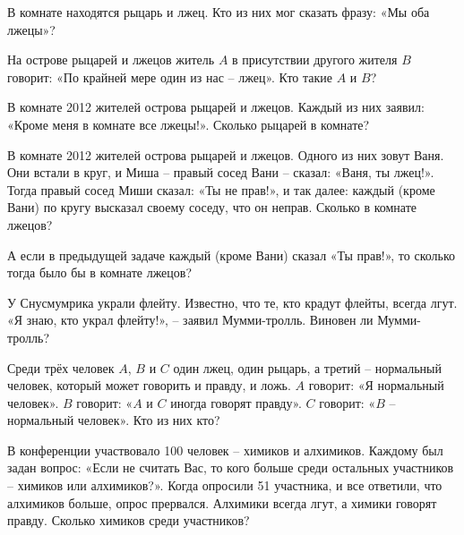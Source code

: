 \begin{ex}
    В комнате находятся рыцарь и лжец. Кто из них мог сказать фразу: «Мы оба лжецы»?
\end{ex}

\begin{ex}
    На острове рыцарей и лжецов житель $A$ в присутствии другого жителя $B$ говорит: «По крайней мере один из нас – лжец». Кто такие $A$ и $B$?
\end{ex}

\begin{ex}
    В комнате 2012 жителей острова рыцарей и лжецов. Каждый из них заявил: «Кроме меня в комнате все лжецы!». Сколько рыцарей в комнате?
\end{ex}

\begin{ex}
    В комнате 2012 жителей острова рыцарей и лжецов. Одного из них зовут Ваня. Они встали в круг, и Миша – правый сосед Вани – сказал: «Ваня, ты лжец!». Тогда правый сосед Миши сказал: «Ты не прав!», и так далее: каждый (кроме Вани) по кругу высказал своему соседу, что он неправ. Сколько в комнате лжецов?
\end{ex}

\begin{ex}
    А если в предыдущей задаче каждый (кроме Вани) сказал «Ты прав!», то сколько тогда было бы в комнате лжецов?
\end{ex}

\begin{ex}
    У Снусмумрика украли флейту. Известно, что те, кто крадут флейты, всегда лгут. «Я знаю, кто украл флейту!», – заявил Мумми-тролль. Виновен ли Мумми-тролль?
\end{ex}

\begin{ex}
    Среди трёх человек $A$, $B$ и $C$ один лжец, один рыцарь, а третий – нормальный человек, который может говорить и правду, и ложь. 
    $A$ говорит: «Я нормальный человек».
    $B$ говорит: «$A$ и $C$ иногда говорят правду». 
    $C$ говорит: «$B$ – нормальный человек».
    Кто из них кто?
\end{ex}

\begin{ex}
     В конференции участвовало 100 человек – химиков и алхимиков. Каждому был задан вопрос: «Если не считать Вас, то кого больше среди остальных участников – химиков или алхимиков?». Когда опросили 51 участника, и все ответили, что алхимиков больше, опрос прервался. Алхимики всегда лгут, а химики говорят правду. Сколько химиков среди участников?
\end{ex}

